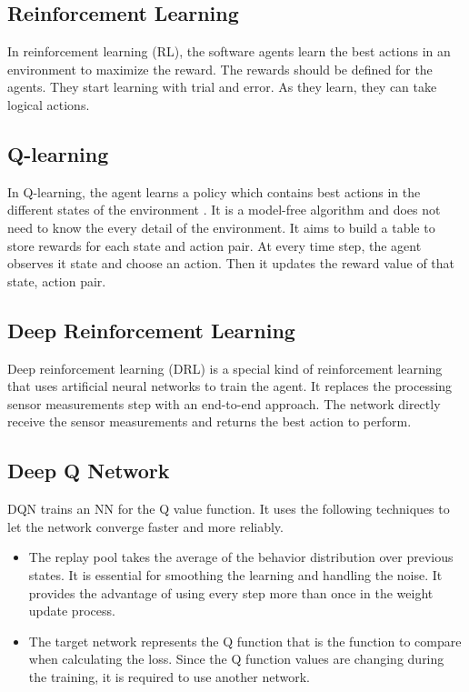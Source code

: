 \documentclass[10pt,journal,compsoc]{IEEEtran}
\begin{document}
\subsection{Reinforcement Learning}
In reinforcement learning (RL), the software agents learn the best actions in an environment to maximize the reward. The rewards should be defined for the agents. They start learning with trial and error. As they learn, they can take logical actions\cite{wiki:rl}.

\subsection{Q-learning}
In Q-learning, the agent learns a policy which contains best actions in the different states of the environment \cite{wiki:ql}. It is a model-free algorithm and does not need to know the every detail of the environment. It aims to build a table to store rewards for each state and action pair. At every time step, the agent observes it state and choose an action. Then it updates the reward value of that state, action pair.

\subsection{Deep Reinforcement Learning}
Deep reinforcement learning (DRL) is a special kind of reinforcement learning that uses artificial neural networks to train the agent. It replaces the processing sensor measurements step with an end-to-end approach. The network directly receive the sensor measurements and returns the best action to perform\cite{wiki:drl}.

\subsection{Deep Q Network}
DQN trains an NN for the Q value function. It uses the following techniques to let the network converge faster and more reliably.

\begin{itemize}
\item The replay pool takes the average of the behavior distribution over previous states. It is essential for smoothing the learning and handling the noise. It provides the advantage of using every step more than once in the weight update process.
\item The target network represents the Q function that is the function to compare when calculating the loss. Since the Q function values are changing during the training, it is required to use another network.
\end{itemize}
\end{document}
